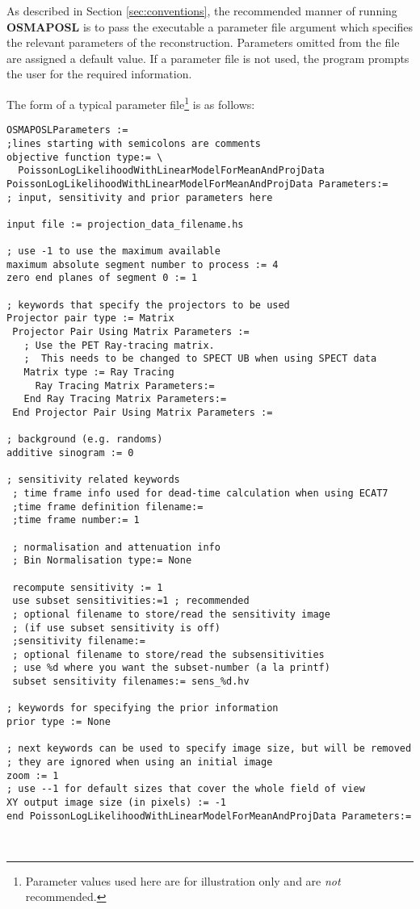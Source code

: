 \documentclass{article}
\begin{document}
As described in Section \ref{sec:conventions}, 
the recommended manner of running \textbf{OSMAPOSL} 
is to pass the executable a parameter file argument which specifies 
the relevant parameters of the reconstruction. Parameters omitted 
from the file are assigned a default value. If a parameter file 
is not used, the program prompts the user for the required information. 



The form of a typical parameter file\footnote{Parameter values used here are for
illustration only and are \textit{not} recommended.} is as follows:

{\small 
\begin{verbatim}
OSMAPOSLParameters :=
;lines starting with semicolons are comments
objective function type:= \
  PoissonLogLikelihoodWithLinearModelForMeanAndProjData
PoissonLogLikelihoodWithLinearModelForMeanAndProjData Parameters:=
; input, sensitivity and prior parameters here

input file := projection_data_filename.hs

; use -1 to use the maximum available
maximum absolute segment number to process := 4
zero end planes of segment 0 := 1

; keywords that specify the projectors to be used
Projector pair type := Matrix 
 Projector Pair Using Matrix Parameters := 
   ; Use the PET Ray-tracing matrix.
   ;  This needs to be changed to SPECT UB when using SPECT data
   Matrix type := Ray Tracing
     Ray Tracing Matrix Parameters:=
   End Ray Tracing Matrix Parameters:= 
 End Projector Pair Using Matrix Parameters :=

; background (e.g. randoms)
additive sinogram := 0

; sensitivity related keywords
 ; time frame info used for dead-time calculation when using ECAT7
 ;time frame definition filename:=
 ;time frame number:= 1

 ; normalisation and attenuation info
 ; Bin Normalisation type:= None
 
 recompute sensitivity := 1
 use subset sensitivities:=1 ; recommended 
 ; optional filename to store/read the sensitivity image 
 ; (if use subset sensitivity is off)
 ;sensitivity filename:=
 ; optional filename to store/read the subsensitivities
 ; use %d where you want the subset-number (a la printf)
 subset sensitivity filenames:= sens_%d.hv

; keywords for specifying the prior information
prior type := None

; next keywords can be used to specify image size, but will be removed
; they are ignored when using an initial image
zoom := 1
; use --1 for default sizes that cover the whole field of view
XY output image size (in pixels) := -1
end PoissonLogLikelihoodWithLinearModelForMeanAndProjData Parameters:=



\end{verbatim}}
\end{document}
